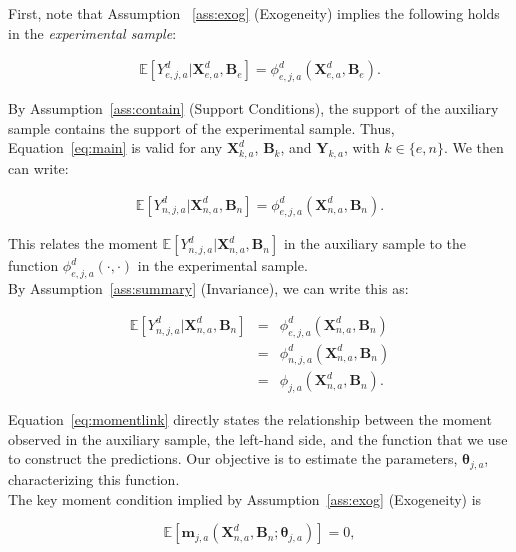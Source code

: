 \noindent First, note that Assumption ~\ref{ass:exog} (Exogeneity) implies the following holds in the \textit{experimental sample}: 

\begin{eqnarray}
\mathbb{E} \left[ Y_{e,j,a}^d | \bm{X}_{e,a}^d, \bm{B}_{e} \right] =  \phi^d_{e,j,a}\left( \bm{X}_{e,a}^d, \bm{B}_{e} \right). \label{eq:main}
\end{eqnarray}

\noindent By Assumption~\ref{ass:contain} (Support Conditions), the support of the auxiliary sample contains the support of the experimental sample. Thus, Equation~\eqref{eq:main} is valid for any $\bm{X}^d_{k,a}$, $\bm{B}_{k}$, and $\bm{Y}_{k,a}$, with $k \in \{ e, n\}$. We then can write: 

\begin{eqnarray}
\mathbb{E} \left[ Y_{n,j,a}^d | \bm{X}_{n,a}^d, \bm{B}_{n} \right] =  \phi^d_{e,j,a}\left( \bm{X}_{n,a}^d, \bm{B}_{n} \right).
\end{eqnarray}

\noindent This relates the moment $\mathbb{E} \left[ Y_{n,j,a}^d | \bm{X}_{n,a}^d, \bm{B}_{n} \right]$ in the auxiliary sample to the function  $\phi^d_{e,j,a}\left( \cdot, \cdot \right)$ in the experimental sample.\\

\noindent By Assumption~\ref{ass:summary} (Invariance), we can write this as: 

\begin{eqnarray}\label{eq:momentlink}
\mathbb{E} \left[ Y_{n,j,a}^d | \bm{X}_{n,a}^d, \bm{B}_{n} \right] &=&  \phi^d_{e,j,a}\left( \bm{X}_{n,a}^d, \bm{B}_{n} \right) \nonumber \\ 
 &=&  \phi^d_{n,j,a}\left( \bm{X}_{n,a}^d, \bm{B}_{n} \right) \nonumber \\
 &=&  \phi_{j,a}\left( \bm{X}_{n,a}^d, \bm{B}_{n} \right). \label{eq:mainpred}
\end{eqnarray}

\noindent Equation~\eqref{eq:momentlink} directly states the relationship between the moment observed in the auxiliary sample, the left-hand side, and the function that we use to construct the predictions. Our objective is to estimate the parameters, $\bm{\theta}_{j,a}$, characterizing this function.\\ 

\noindent The key moment condition implied by Assumption~\ref{ass:exog} (Exogeneity) is 

\begin{equation}
\mathbb{E} \left[ \bm{m}_{j,a} \left( \bm{X}_{n,a}^d, \bm{B}_{n}; \bm{\theta}_{j,a} \right) \right] = 0, \label{eq:moment}
\end{equation}

